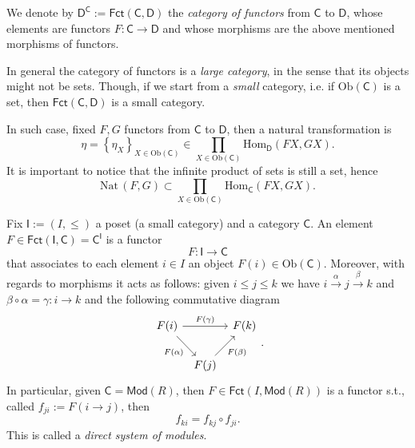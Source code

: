 \begin{defn}
	We denote by $\mathsf{D}^{\mathsf{C}} := \mathsf{Fct}\left(\mathsf{C}, \mathsf{D} \right)$ the {\em category of functors} from $\mathsf{C}$ to $\mathsf{D}$,
	whose elements are functors $F: \mathsf{C} \to \mathsf{D}$ and whose morphisms are the above mentioned morphisms of functors.
\end{defn}

\begin{rem}
	In general the category of functors is a {\em large category}, in the sense that its objects might not be sets.
	Though, if we start from a {\em small} category, i.e. if $\mathrm{Ob} \left(\mathsf{C}\right)$ is a set,
	then $\mathsf{Fct}\left(\mathsf{C}, \mathsf{D} \right) $ is a small category.

	In such case, fixed $F, G$ functors from $\mathsf{C}$ to $\mathsf{D}$, then a natural transformation is
	\begin{equation}
	\eta = \left\{ \eta_X \right\}_{X \in \mathrm{Ob} \left(\mathsf{C}\right)} \in \prod_{X \in \mathrm{Ob} \left(\mathsf{C}\right)} \mathrm{Hom}_{\mathsf{D}} \left( FX, GX \right)
	.\end{equation} 
	It is important to notice that the infinite product of sets is still a set, hence
	\begin{equation}
	\mathrm{Nat}\, \left(F, G\right) \subset \prod_{X \in \mathrm{Ob} \left(\mathsf{C}\right)} \mathrm{Hom}_{\mathsf{C}} \left( FX, GX \right)
	.\end{equation} 
\end{rem}

\begin{ex}
	Fix $\mathsf{I} := \left(I, \le\right)$ a poset (a small category) and a category $\mathsf{C}$.
	An element $F \in \mathsf{Fct}\left(\mathsf{I}, \mathsf{C} \right) = \mathsf{C}^{\mathsf{I}}$ is a functor
	\begin{equation}
	F: \mathsf{I} \to \mathsf{C}
	\end{equation} 
	that associates to each element $i \in I$ an object $F(i) \in \mathrm{Ob} \left(\mathsf{C}\right)$.
	Moreover, with regards to morphisms it acts as follows: given $i \leq j \le k$ we have $i \xrightarrow{\alpha} j \xrightarrow{\beta} k$ and $\beta \circ \alpha = \gamma : i \to k$ and the following commutative diagram
	\begin{equation}
	\begin{tikzcd}[column sep=tiny]
		F(i) \arrow[rr, "F(\gamma)", rightarrow] \arrow[rd, "F(\alpha)"', rightarrow] & & F(k)\\
			& F(j) \arrow[ru, "F(\beta)"', rightarrow] &
	\end{tikzcd}
	.\end{equation} 
	In particular, given $\mathsf{C} = \mathsf{Mod}\left( R \right)$, then $F \in \mathsf{Fct}\left(I, \mathsf{Mod}\left( R \right) \right)$ is a functor s.t., called $f_{ji} := F( i \to j)$, then
	\begin{equation}
		f_{ki} = f_{kj} \circ f_{ji}
	.\end{equation} 
	This is called a {\em direct system of modules}.
\end{ex} 

